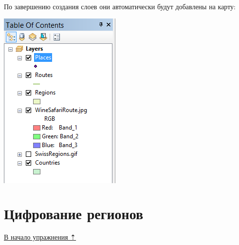 \documentclass[]{book}
\theoremstyle{definition}
\theoremstyle{definition}
\theoremstyle{definition}
\theoremstyle{remark}
\begin{document}
По завершению создания слоев они автоматически будут добавлены на карту:

\includegraphics{images/Ex05/image14.png}

\hypertarget{map-ref-general-digitizing}{%
\section{Цифрование регионов}\label{map-ref-general-digitizing}}

\protect\hyperlink{map-ref-general}{В начало упражнения ⇡}
\end{document}
